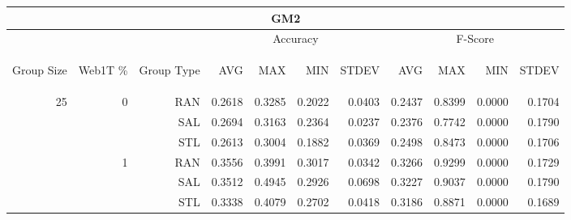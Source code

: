 \begin{center}
\begin{table}[htbp] 
 \begin{center}
\begin{tabular}{ | r | r | r | r | r | r | r | r | r | r | r |}
\hline
\multicolumn{11}{|c|}{GM2}\\
\hline
 & & & \multicolumn{4}{|c|}{Accuracy} & \multicolumn{4}{|c|}{F-Score}\\ \cline{4-11}
\begin{sideways}Group Size\end{sideways} & \begin{sideways}Web1T \%\end{sideways} & \begin{sideways}Group Type\end{sideways} & \begin{sideways}AVG\end{sideways} & \begin{sideways}MAX\end{sideways} & \begin{sideways}MIN\end{sideways} & \begin{sideways}STDEV\end{sideways} & \begin{sideways}AVG\end{sideways} & \begin{sideways}MAX\end{sideways} & \begin{sideways}MIN\end{sideways} & \begin{sideways}STDEV\end{sideways}\\
\hline
\multirow{18}{*}{25}
 & \multirow{3}{*}{0} & RAN & 0.2618 & 0.3285 & 0.2022 & 0.0403 & 0.2437 & 0.8399 & 0.0000 & 0.1704\\ \cline{3-11}
 &   & SAL & 0.2694 & 0.3163 & 0.2364 & 0.0237 & 0.2376 & 0.7742 & 0.0000 & 0.1790\\ \cline{3-11}
 &   & STL & 0.2613 & 0.3004 & 0.1882 & 0.0369 & 0.2498 & 0.8473 & 0.0000 & 0.1706\\ \cline{2-11}
 & \multirow{3}{*}{1} & RAN & 0.3556 & 0.3991 & 0.3017 & 0.0342 & 0.3266 & 0.9299 & 0.0000 & 0.1729\\ \cline{3-11}
 &   & SAL & 0.3512 & 0.4945 & 0.2926 & 0.0698 & 0.3227 & 0.9037 & 0.0000 & 0.1790\\ \cline{3-11}
 &   & STL & 0.3338 & 0.4079 & 0.2702 & 0.0418 & 0.3186 & 0.8871 & 0.0000 & 0.1689\\ \cline{2-11}

\end{tabular}
\end{center}
\end{table}
\end{center}
